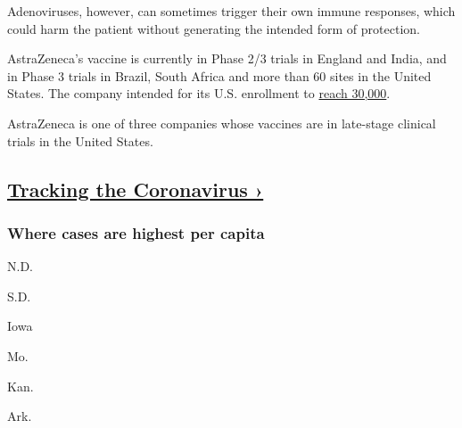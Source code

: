 Adenoviruses, however, can sometimes trigger their own immune responses,
which could harm the patient without generating the intended form of
protection.

AstraZeneca's vaccine is currently in Phase 2/3 trials in England and
India, and in Phase 3 trials in Brazil, South Africa and more than 60
sites in the United States. The company intended for its U.S. enrollment
to
\href{https://www.nih.gov/news-events/news-releases/phase-3-clinical-testing-us-astrazeneca-covid-19-vaccine-candidate-begins}{reach
30,000}.

AstraZeneca is one of three companies whose vaccines are in late-stage
clinical trials in the United States.

\hypertarget{tracking-the-coronavirus-}{%
\subsection{\texorpdfstring{\href{https://www.nytimes3xbfgragh.onion/interactive/2020/us/coronavirus-us-cases.html}{Tracking
the Coronavirus
›}}{Tracking the Coronavirus ›}}\label{tracking-the-coronavirus-}}

\href{https://www.nytimes3xbfgragh.onion/interactive/2020/us/coronavirus-us-cases.html}{}

\hypertarget{where-cases-are-highest-per-capita}{%
\subsubsection{\texorpdfstring{Where cases are \textbf{highest} per
capita}{Where cases are highest per capita}}\label{where-cases-are-highest-per-capita}}

\href{https://www.nytimes3xbfgragh.onion/interactive/2020/us/north-dakota-coronavirus-cases.html}{}

N.D.
\href{https://www.nytimes3xbfgragh.onion/interactive/2020/us/south-dakota-coronavirus-cases.html}{}

S.D.
\href{https://www.nytimes3xbfgragh.onion/interactive/2020/us/iowa-coronavirus-cases.html}{}

Iowa
\href{https://www.nytimes3xbfgragh.onion/interactive/2020/us/missouri-coronavirus-cases.html}{}

Mo.
\href{https://www.nytimes3xbfgragh.onion/interactive/2020/us/kansas-coronavirus-cases.html}{}

Kan.
\href{https://www.nytimes3xbfgragh.onion/interactive/2020/us/arkansas-coronavirus-cases.html}{}

Ark.
\href{https://www.nytimes3xbfgragh.onion/interactive/2020/us/tennessee-coronavirus-cases.html}{}

